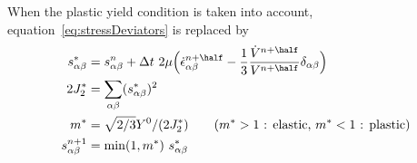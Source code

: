 When the plastic yield condition is taken into account, equation~\eqref{eq:stressDeviators} is replaced by 
\begin{align}
    s_{\alpha\beta}^{*} &= s_{\alpha\beta}^{n} + \dt~ 2 \mu\Big( \dot{\epsilon}_{\alpha\beta}^{n+\half} 
        -  \frac{1}{3}{\dot{V}^{n+\half}  \over V^{n+\half} }\delta_{\alpha\beta} \Big)\\
    2 J_2^* &= \sum_{\alpha\beta} (s_{\alpha\beta}^{*})^2  \\
    m^* &= \sqrt{2/3} Y^0 /(2 J_2^*) \qquad\text{($m^*>1$ : elastic, $m^*<1$ : plastic)} \\
    s_{\alpha\beta}^{n+1} &= \min(1,m^*) ~s_{\alpha\beta}^{*}
\end{align}
